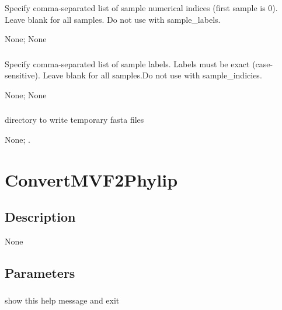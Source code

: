 \documentclass[letterpaper,11pt,english]{sphinxmanual}
\begin{document}
\subsubsection{}
\label{\detokenize{prog_desc:sample-indices-sampleindices}}
 Specify comma-separated list of sample numerical indices (first sample is 0). Leave blank for all samples. Do not use with \textendash{}sample\_labels.

 None;  None


\subsubsection{}
\label{\detokenize{prog_desc:sample-labels}}
 Specify comma-separated list of sample labels. Labels must be exact (case-sensitive). Leave blank for all samples.Do not use with \textendash{}sample\_indicies.

 None;  None


\subsubsection{}
\label{\detokenize{prog_desc:temp-dir-tempdir}}
 directory to write temporary fasta files

 None;  .


\section{ConvertMVF2Phylip}
\label{\detokenize{prog_desc:convertmvf2phylip}}

\subsection{Description}
\label{\detokenize{prog_desc:id20}}
None


\subsection{Parameters}
\label{\detokenize{prog_desc:id21}}

\subsubsection{}
\label{\detokenize{prog_desc:id22}}
 show this help message and exit
\end{document}
